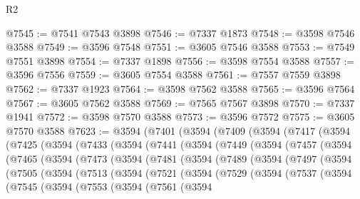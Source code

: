 \begin{lexlean}{R2}
\begin{coremodule}
@7545 := @7541 @7543 @3898
@7546 := @7337 @1873
@7548 := @3598 @7546 @3588
@7549 := @3596 @7548
@7551 := @3605 @7546 @3588
@7553 := @7549 @7551 @3898
@7554 := @7337 @1898
@7556 := @3598 @7554 @3588
@7557 := @3596 @7556
@7559 := @3605 @7554 @3588
@7561 := @7557 @7559 @3898
@7562 := @7337 @1923
@7564 := @3598 @7562 @3588
@7565 := @3596 @7564
@7567 := @3605 @7562 @3588
@7569 := @7565 @7567 @3898
@7570 := @7337 @1941
@7572 := @3598 @7570 @3588
@7573 := @3596 @7572
@7575 := @3605 @7570 @3588
@7623 := @3594
    (@7401
      (@3594
        (@7409
          (@3594
            (@7417
              (@3594
                (@7425
                  (@3594
                    (@7433
                      (@3594
                        (@7441
                          (@3594
                            (@7449
                              (@3594
                                (@7457
                                  (@3594
                                    (@7465
                                      (@3594
                                        (@7473
                                          (@3594
                                            (@7481
                                              (@3594
                                                (@7489
                                                  (@3594
                                                    (@7497
                                                      (@3594
                                                        (@7505
                                                          (@3594
                                                            (@7513
                                                              (@3594
                                                                (@7521
                                                                  (@3594
                                                                    (@7529
                                                                      (@3594
                                                                        (@7537
                                                                          (@3594
                                                                            (@7545
                                                                              (@3594
                                                                                (@7553
                                                                                  (@3594
                                                                                    (@7561
                                                                                      (@3594

\end{coremodule}
\end{lexlean}
